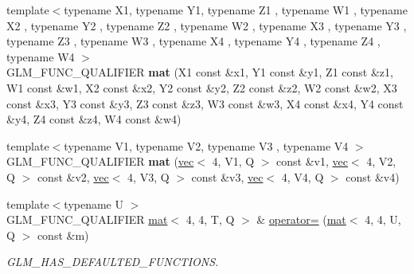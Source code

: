 \begin{DoxyCompactItemize}
\item 
\mbox{\label{structglm_1_1mat_3_014_00_014_00_01T_00_01Q_01_4_abc8d15b0dcf0980a46a5ecc659f369d4}} 
{\footnotesize template$<$typename X1, typename Y1, typename Z1 , typename W1 , typename X2 , typename Y2 , typename Z2 , typename W2 , typename X3 , typename Y3 , typename Z3 , typename W3 , typename X4 , typename Y4 , typename Z4 , typename W4 $>$ }\\G\+L\+M\+\_\+\+F\+U\+N\+C\+\_\+\+Q\+U\+A\+L\+I\+F\+I\+ER {\bfseries mat} (X1 const \&x1, Y1 const \&y1, Z1 const \&z1, W1 const \&w1, X2 const \&x2, Y2 const \&y2, Z2 const \&z2, W2 const \&w2, X3 const \&x3, Y3 const \&y3, Z3 const \&z3, W3 const \&w3, X4 const \&x4, Y4 const \&y4, Z4 const \&z4, W4 const \&w4)
\item 
\mbox{\label{structglm_1_1mat_3_014_00_014_00_01T_00_01Q_01_4_a6f9e6e274e0639fee659504ff3a6db61}} 
{\footnotesize template$<$typename V1, typename V2, typename V3 , typename V4 $>$ }\\G\+L\+M\+\_\+\+F\+U\+N\+C\+\_\+\+Q\+U\+A\+L\+I\+F\+I\+ER {\bfseries mat} (\hyperlink{structglm_1_1vec}{vec}$<$ 4, V1, Q $>$ const \&v1, \hyperlink{structglm_1_1vec}{vec}$<$ 4, V2, Q $>$ const \&v2, \hyperlink{structglm_1_1vec}{vec}$<$ 4, V3, Q $>$ const \&v3, \hyperlink{structglm_1_1vec}{vec}$<$ 4, V4, Q $>$ const \&v4)
\item 
\mbox{\label{structglm_1_1mat_3_014_00_014_00_01T_00_01Q_01_4_ad612dc3c6f4cc9801a10891b5e648341}} 
{\footnotesize template$<$typename U $>$ }\\G\+L\+M\+\_\+\+F\+U\+N\+C\+\_\+\+Q\+U\+A\+L\+I\+F\+I\+ER \hyperlink{structglm_1_1mat}{mat}$<$ 4, 4, T, Q $>$ \& \hyperlink{structglm_1_1mat_3_014_00_014_00_01T_00_01Q_01_4_ad612dc3c6f4cc9801a10891b5e648341}{operator=} (\hyperlink{structglm_1_1mat}{mat}$<$ 4, 4, U, Q $>$ const \&m)
\begin{DoxyCompactList}\small\item\em G\+L\+M\+\_\+\+H\+A\+S\+\_\+\+D\+E\+F\+A\+U\+L\+T\+E\+D\+\_\+\+F\+U\+N\+C\+T\+I\+O\+NS. \end{DoxyCompactList}\item 
\mbox{\label{structglm_1_1mat_3_014_00_014_00_01T_00_01Q_01_4_a78e8853303a6899f72b463c9075c4599}} 

\end{DoxyCompactItemize}
